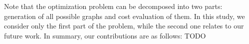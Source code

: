 




Note that the optimization problem can be decomposed into two parts: generation of all possible graphs and cost evaluation of them.
In this study, we consider only the first part of the problem, while the second one relates to our future work.
In summary, our contributions are as follows: TODO

